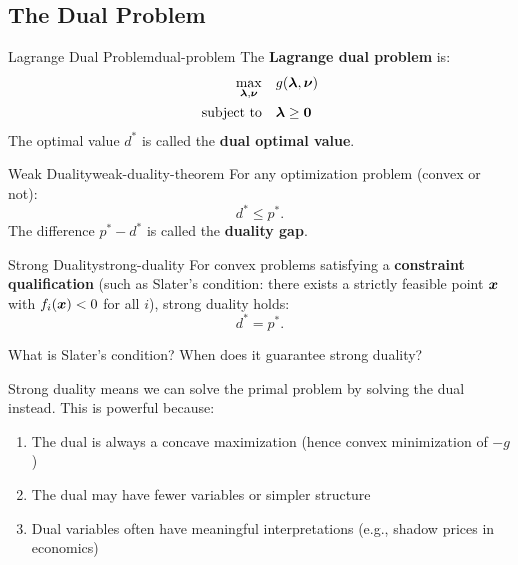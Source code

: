 \documentclass[../../main.tex]{subfiles}
\begin{document}
\subsection{The Dual Problem}

\begin{definition}{Lagrange Dual Problem}{dual-problem}
The \textbf{Lagrange dual problem} is:
\begin{align*}
    \max_{\boldsymbol{\lambda}, \boldsymbol{\nu}} \quad & g(\boldsymbol{\lambda}, \boldsymbol{\nu}) \\
    \text{subject to} \quad & \boldsymbol{\lambda} \geq \boldsymbol{0}
\end{align*}
The optimal value $d^*$ is called the \textbf{dual optimal value}.
\end{definition}

\begin{theorem}{Weak Duality}{weak-duality-theorem}
For any optimization problem (convex or not):
\[
    d^* \leq p^*.
\]
The difference $p^* - d^*$ is called the \textbf{duality gap}.
\end{theorem}

\begin{theorem}{Strong Duality}{strong-duality}
For convex problems satisfying a \textbf{constraint qualification} (such as Slater's condition: there exists a strictly feasible point $\boldsymbol{x}$ with $f_i(\boldsymbol{x}) < 0$ for all $i$), strong duality holds:
\[
    d^* = p^*.
\]
\end{theorem}

\begin{checkpoint}
What is Slater's condition? When does it guarantee strong duality?
\end{checkpoint}

\begin{keyconcept}
Strong duality means we can solve the primal problem by solving the dual instead. This is powerful because:
\begin{enumerate}
    \item The dual is always a concave maximization (hence convex minimization of $-g$)
    \item The dual may have fewer variables or simpler structure
    \item Dual variables often have meaningful interpretations (e.g., shadow prices in economics)
\end{enumerate}
\end{keyconcept}
\end{document}
